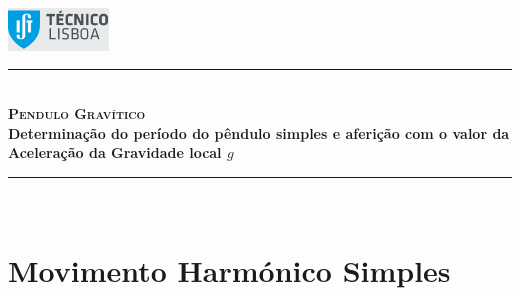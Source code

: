 \documentclass[a4paper,twoside,12pt]{article}      %
\author{Prof. Bernardo B. Carvalho}
\date{ Setembro 2012}
\newcommand{\HRule}{\rule{\linewidth}{0.5mm}}
\begin{document}
 

\includegraphics[width=0.2\textwidth]{./logo-ist}%
	
	\HRule \\[0.5cm]
	{ \huge   \bfseries \textsc{ Pendulo Gravítico } }\\[0.4cm]
	{ \large \bfseries Determinação do período do pêndulo simples e aferição com o valor da Aceleração da Gravidade local $g$  }\\
	\HRule \\%
	
%	 


\section{\sf Movimento Harmónico Simples}
\end{document}
